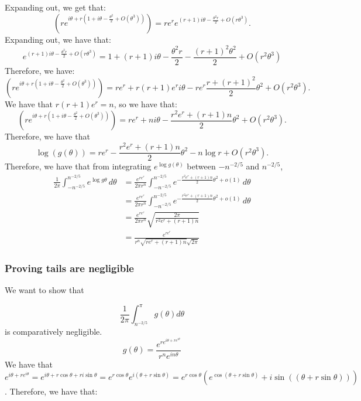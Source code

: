 \documentclass[]{article}
\theoremstyle{definition}
\numberwithin{theorem}{section}
\numberwithin{equation}{section}
\begin{document}
Expanding out, we get that:
\begin{equation}
	 (r e^{i \theta + r ( 1 + i \theta - \frac{\theta^2}{2} + O(\theta^3))}) = r e^r e^{(r + 1) i \theta- \frac{\theta^2 r}{2} + O(r\theta^3)}.
\end{equation}
Expanding out, we have that:
\begin{equation}
	e^{(r + 1) i \theta- \frac{\theta^2 r}{2} + O(r\theta^3)} = 1 + (r + 1) i \theta - \frac{\theta^2 r}{2} - \frac{(r + 1)^2 \theta^2}{2} + O(r^2 \theta^3)
\end{equation}
Therefore, we have:
\begin{equation}
	(r e^{i \theta + r ( 1 + i \theta - \frac{\theta^2}{2} + O(\theta^3))}) = r e^r + r(r + 1) e^r i \theta - r e^r \frac{r + (r + 1)^2 }{2} \theta^2 + O(r^2 \theta^3).
\end{equation}
We have that $r(r + 1) e^r = n$, so we have that:
\begin{equation}
	(r e^{i \theta + r ( 1 + i \theta - \frac{\theta^2}{2} + O(\theta^3))}) = r e^r + n i \theta - \frac{r^2 e^r + (r + 1) n}{2} \theta^2 + O(r^2 \theta^3).
\end{equation}
Therefore, we have that
\begin{equation}
	\log(g(\theta)) = r e^r - \frac{r^2 e^r + (r + 1) n }{2} \theta^2 - n \log r + O(r^2 \theta^3).
\end{equation}
Therefore, we have that from integrating $e^{\log g(\theta)}$ between $-n^{-2/5}$ and $n^{-2/5}$, 
\begin{align*}
	\frac{1}{2 \pi}\int_{-n^{-2/5}}^{n^{-2/5}} e^{\log g \theta} \, d\theta &= \frac{e^{r e^r}}{2 \pi r^n} \int_{-n^{-2/5}}^{n^{-2/5}} e^{- \frac{r^2 e^r + (r + 1) n }{2} \theta^2 + o(1)} \, d\theta\\
	&=  \frac{e^{r e^r}}{ 2 \pi r^n} \int_{-n^{-2/5}}^{n^{-2/5}} e^{- \frac{r^2 e^r + (r + 1) n }{2} \theta^2 + o(1)} \, d\theta\\
	&= \frac{e^{r e^r}}{2 \pi r^n}\sqrt{\frac{2\pi}{r^2 e^r + (r + 1) n}}\\
	&= \frac{e^{r e^r}}{r^n \sqrt{r e^r + (r + 1)n} \sqrt{2\pi}}
\end{align*}
\subsubsection{Proving tails are negligible}
We want to show that

\begin{equation}
	\frac{1}{2 \pi} \int_{n^{-2/5}}^\pi g(\theta) d\theta
\end{equation}
is comparatively negligible.
\begin{equation}
	g(\theta) = \frac{e^{r e^{i \theta + r e^{i \theta}}}}{r^n e^{i n \theta}}
\end{equation}
We have that $e^{i \theta + r e^{i \theta}} = e^{i \theta + r \cos \theta + r i \sin \theta} = e^{r \cos \theta} e^{i( \theta + r \sin \theta)} = e^{r \cos \theta}(e^{\cos(\theta + r \sin \theta)} + i \sin((\theta + r \sin \theta)) )$. 
Therefore, we have that:
\end{document}
